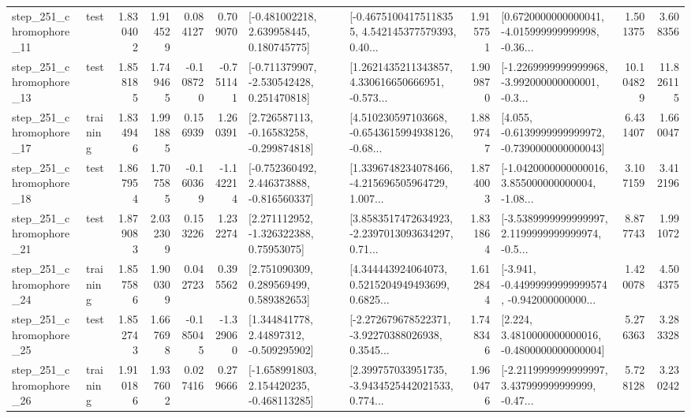 \begin{tabular}{llrrrrllrlrr}
  step\_251\_chromophore\_11 &      test &      1.830402 &    1.914529 &      0.084127 &  0.709070 &    [-0.481002218, 2.639958445, 0.180745775] &  [-0.46751004175118355, 4.542145377579393, 0.40... &       1.915751 &  [0.6720000000000041, -4.015999999999998, -0.36... &            1.501375 &          3.608356 \\
  step\_251\_chromophore\_13 &      test &      1.858185 &    1.749465 &     -0.108720 & -0.751141 &   [-0.711379907, -2.530542428, 0.251470818] &  [1.2621435211343857, 4.330616650666951, -0.573... &       1.909870 &  [-1.2269999999999968, -3.992000000000001, -0.3... &           10.104829 &         11.826115 \\
  step\_251\_chromophore\_17 &  training &      1.834946 &    1.991885 &      0.156939 &  1.260391 &    [2.726587113, -0.16583258, -0.299874818] &  [4.510230597103668, -0.6543615994938126, -0.68... &       1.889747 &  [4.055, -0.6139999999999972, -0.7390000000000043] &            6.431407 &          1.660047 \\
  step\_251\_chromophore\_18 &      test &      1.867954 &    1.707585 &     -0.160369 & -1.142214 &   [-0.752360492, 2.446373888, -0.816560337] &  [1.3396748234078466, -4.215696505964729, 1.007... &       1.874003 &  [-1.0420000000000016, 3.855000000000004, -1.08... &            3.107159 &          3.412196 \\
  step\_251\_chromophore\_21 &      test &      1.879083 &    2.032309 &      0.153226 &  1.232274 &     [2.271112952, -1.326322388, 0.75953075] &  [3.8583517472634923, -2.2397013093634297, 0.71... &       1.831864 &  [-3.5389999999999997, 2.1199999999999974, -0.5... &            8.877743 &          1.991072 \\
  step\_251\_chromophore\_24 &  training &      1.857586 &    1.900309 &      0.042723 &  0.395562 &     [2.751090309, 0.289569499, 0.589382653] &  [4.344443924064073, 0.5215204949493699, 0.6825... &       1.612844 &  [-3.941, -0.44999999999999574, -0.942000000000... &            1.420078 &          4.504375 \\
  step\_251\_chromophore\_25 &      test &      1.852743 &    1.667698 &     -0.185045 & -1.329060 &     [1.344841778, 2.44897312, -0.509295902] &  [-2.272679678522371, -3.92270388026938, 0.3545... &       1.748346 &   [2.224, 3.4810000000000016, -0.4800000000000004] &            5.276363 &          3.283328 \\
  step\_251\_chromophore\_26 &  training &      1.910186 &    1.937602 &      0.027416 &  0.279666 &   [-1.658991803, 2.154420235, -0.468113285] &  [2.399757033951735, -3.9434525442021533, 0.774... &       1.960476 &  [-2.2119999999999997, 3.437999999999999, -0.47... &            5.728128 &          3.230242 \\

\end{tabular}
